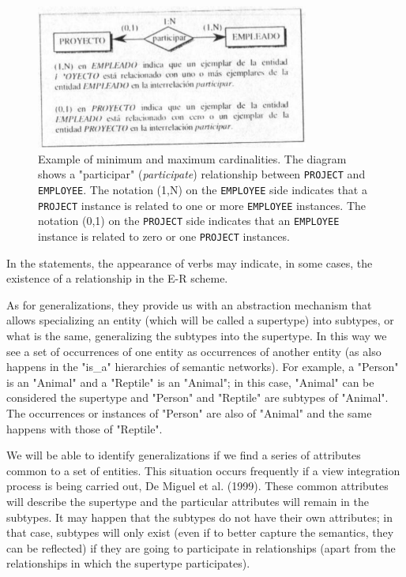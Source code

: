 \documentclass{article}
\begin{document}
\begin{figure}
    \centering
    \includegraphics[width=0.8\textwidth]{figures/fig2}
    \caption{Example of minimum and maximum cardinalities. The diagram shows a "participar" (\textit{participate}) relationship between \texttt{PROJECT} and \texttt{EMPLOYEE}. The notation (1,N) on the \texttt{EMPLOYEE} side indicates that a \texttt{PROJECT} instance is related to one or more \texttt{EMPLOYEE} instances. The notation (0,1) on the \texttt{PROJECT} side indicates that an \texttt{EMPLOYEE} instance is related to zero or one \texttt{PROJECT} instances.}
    \label{fig:fig1.2}
\end{figure}

In the statements, the appearance of verbs may indicate, in some cases, the existence of a relationship in the E-R scheme.

As for generalizations, they provide us with an abstraction mechanism that allows specializing an entity (which will be called a supertype) into subtypes, or what is the same, generalizing the subtypes into the supertype.  In this way we see a set of occurrences of one entity as occurrences of another entity (as also happens in the "is\_a" hierarchies of semantic networks).  For example, a "Person" is an "Animal" and a "Reptile" is an "Animal"; in this case, "Animal" can be considered the supertype and "Person" and "Reptile" are subtypes of "Animal".  The occurrences or instances of "Person" are also of "Animal" and the same happens with those of "Reptile".

We will be able to identify generalizations if we find a series of attributes common to a set of entities.  This situation occurs frequently if a view integration process is being carried out, De Miguel et al. (1999).  These common attributes will describe the supertype and the particular attributes will remain in the subtypes.  It may happen that the subtypes do not have their own attributes; in that case, subtypes will only exist (even if to better capture the semantics, they can be reflected) if they are going to participate in relationships (apart from the relationships in which the supertype participates).
\end{document}
